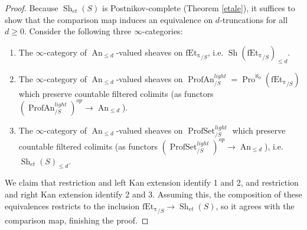\documentclass[12pt]{article}
\newcommand{\on}{\operatorname}
\begin{document}
\begin{proof}
Because $\on{Sh}_{et}(S)$ is Postnikov-complete (Theorem \ref{etale}), it suffices to show that the comparison map induces an equivalence on $d$-truncations for all $d\geq 0$.  Consider the following three $\infty$-categories:
\begin{enumerate}
\item The $\infty$-category of $\on{An}_{\leq d}$-valued sheaves on $\on{fEt_\pi}_{/S}$, i.e. $\on{Sh}(\on{fEt_\pi}_{/S})_{\leq d}$.
\item The $\infty$-category of $\on{An}_{\leq d}$-valued sheaves on $\on{ProfAn}^{light}_{/S}=\on{Pro}^{\aleph_0}(\on{fEt_\pi}_{/S})$ which preserve countable filtered colimits (as functors $(\on{ProfAn}^{light}_{/S})^{op}\to \on{An}_{\leq d}$).
\item The $\infty$-category of $\on{An}_{\leq d}$-valued sheaves on $\on{ProfSet}^{light}_{/S}$ which preserve countable filtered colimits (as functors $(\on{ProfSet}^{light}_{/S})^{op}\to\on{An}_{\leq d}$), i.e.\ $\on{Sh}_{et}(S)_{\leq d}$.
\end{enumerate}
We claim that restriction and left Kan extension identify 1 and 2, and restriction and right Kan extension identify 2 and 3.  Assuming this, the composition of these equivalences restricts to the inclusion $\on{fEt_\pi}_{/S}\rightarrow \on{Sh}_{et}(S)$, so it agrees with the comparison map, finishing the proof.

\end{proof}
\end{document}
